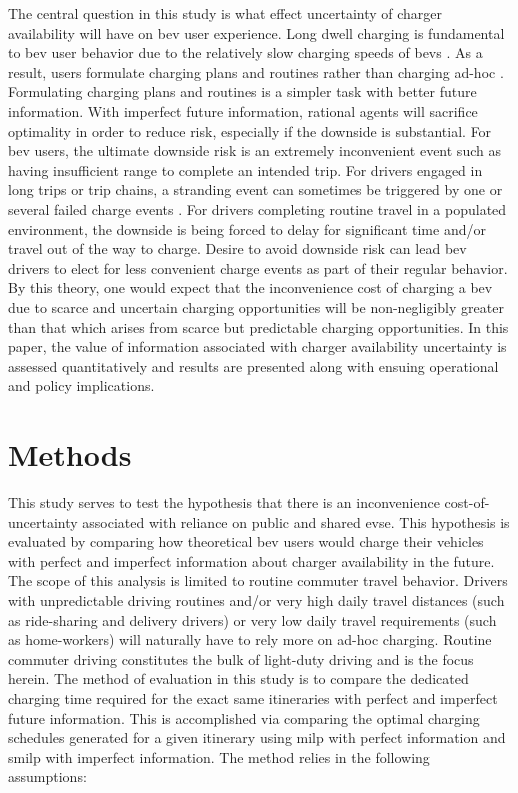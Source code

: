 \documentclass[letterpaper]{sae}
\begin{document}
The central question in this study is what effect uncertainty of charger availability will have on \gls{bev} user experience. Long dwell charging is fundamental to \gls{bev} user behavior due to the relatively slow charging speeds of \glspl{bev} \cite{AFDC_EVs_2023}. As a result, users formulate charging plans and routines rather than charging ad-hoc \cite{Bunce_2014,Chakraborty_2019,Dunckley_2016}. Formulating charging plans and routines is a simpler task with better future information. With imperfect future information, rational agents will sacrifice optimality in order to reduce risk, especially if the downside is substantial. For \gls{bev} users, the ultimate downside risk is an extremely inconvenient event such as having insufficient range to complete an intended trip. For drivers engaged in long trips or trip chains, a stranding event can sometimes be triggered by one or several failed charge events \cite{Karanam_2023}. For drivers completing routine travel in a populated environment, the downside is being forced to delay for significant time and/or travel out of the way to charge. Desire to avoid downside risk can lead \gls{bev} drivers to elect for less convenient charge events as part of their regular behavior. By this theory, one would expect that the inconvenience cost of charging a \gls{bev} due to scarce and uncertain charging opportunities will be non-negligibly greater than that which arises from scarce but predictable charging opportunities. In this paper, the value of information associated with charger availability uncertainty is assessed quantitatively and results are presented along with ensuing operational and policy implications.

\section{Methods}\label{sec:methods}

This study serves to test the hypothesis that there is an inconvenience cost-of-uncertainty associated with reliance on public and shared \gls{evse}. This hypothesis is evaluated by comparing how theoretical \gls{bev} users would charge their vehicles with perfect and imperfect information about charger availability in the future. The scope of this analysis is limited to routine commuter travel behavior. Drivers with unpredictable driving routines and/or very high daily travel distances (such as ride-sharing and delivery drivers) or very low daily travel requirements (such as home-workers) will naturally have to rely more on ad-hoc charging. Routine commuter driving constitutes the bulk of light-duty driving \cite{nhts_2017} and is the focus herein. The method of evaluation in this study is to compare the dedicated charging time required for the exact same itineraries with perfect and imperfect future information. This is accomplished via comparing the optimal charging schedules generated for a given itinerary using  \gls{milp} with perfect information and \gls{smilp} with imperfect information. The method relies in the following assumptions:
\end{document}
